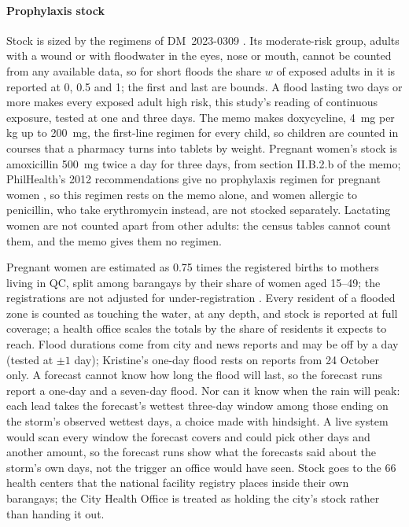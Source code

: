 \paragraph{Prophylaxis stock}
Stock is sized by the regimens of DM~\mbox{2023-0309} \parencite{doh2023}. Its moderate-risk
group, adults with a wound or with floodwater in the eyes, nose or mouth, cannot be counted from
any available data, so for short floods the share $w$ of exposed adults in it is reported at 0,
0.5 and 1; the first and last are bounds. A flood lasting two days or more makes every exposed
adult high risk, this study's reading of continuous exposure, tested at one and three days. The memo makes doxycycline, 4~mg
per kg up to 200~mg, the first-line regimen for every child, so children are counted in courses
that a pharmacy turns into tablets by weight. Pregnant women's stock is amoxicillin 500~mg twice
a day for three days, from section II.B.2.b of the memo; PhilHealth's 2012 recommendations give
no prophylaxis regimen for pregnant women \parencite{philhealth2012}, so this regimen rests on
the memo alone, and women allergic to penicillin, who take erythromycin instead, are not stocked
separately. Lactating women are not counted apart from other adults: the census tables cannot
count them, and the memo gives them no regimen.

Pregnant women are estimated as 0.75 times the registered births to mothers living in QC, split
among barangays by their share of women aged 15--49; the registrations are not adjusted for
under-registration \parencite{psa_births2026}. Every resident of a flooded zone is counted as
touching the water, at any depth, and stock is reported at full coverage; a health office scales
the totals by the share of residents it expects to reach. Flood durations come from city and news
reports and may be off by a day (tested at $\pm1$ day); Kristine's one-day flood rests on
reports from 24 October only. A forecast cannot know how long the flood will last, so the
forecast runs report a one-day and a seven-day flood. Nor can it know when the rain will peak:
each lead takes the forecast's wettest three-day window among those ending on the storm's
observed wettest days, a choice made with hindsight. A live system would scan every window the
forecast covers and could pick other days and another amount, so the forecast runs show what
the forecasts said about the storm's own days, not the trigger an office would have seen.
Stock goes to the 66 health centers that
the national facility registry places inside their own barangays; the City Health Office is
treated as holding the city's stock rather than handing it out.

